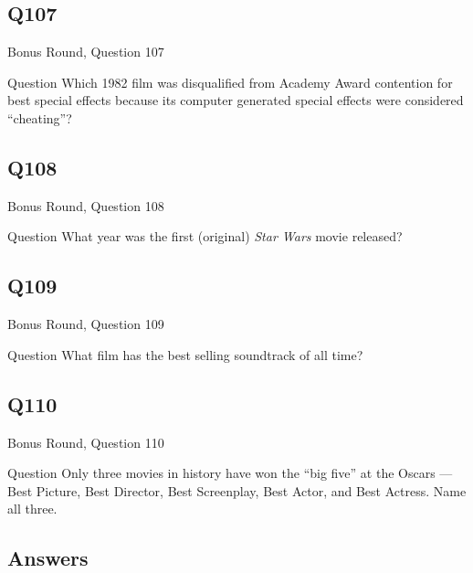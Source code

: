 \documentclass[11pt]{beamer}
\begin{document}
\subsection*{Q107}
\begin{frame}[t]{Bonus Round, Question 107}
\vspace{2em}
\begin{block}{Question}
Which 1982 film was disqualified from Academy Award contention for best special effects because its computer generated special effects were considered ``cheating''?
\end{block}
\end{frame}
    

\subsection*{Q108}
\begin{frame}[t]{Bonus Round, Question 108}
\vspace{2em}
\begin{block}{Question}
What year was the first (original) \emph{Star Wars} movie released?
\end{block}
\end{frame}
    

\subsection*{Q109}
\begin{frame}[t]{Bonus Round, Question 109}
\vspace{2em}
\begin{block}{Question}
What film has the best selling soundtrack of all time?
\end{block}
\end{frame}
    

\subsection*{Q110}
\begin{frame}[t]{Bonus Round, Question 110}
\vspace{2em}
\begin{block}{Question}
Only three movies in history have won the ``big five'' at the Oscars — Best Picture, Best Director, Best Screenplay, Best Actor, and Best Actress. Name all three.
\end{block}
\end{frame}
    
\subsection{Answers}
\end{document}
